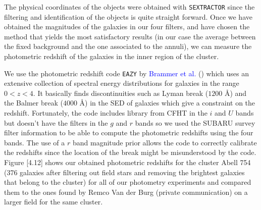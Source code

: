 The physical coordinates of the objects  were obtained with \texttt{SEXTRACTOR} since the filtering and identification of the objects is quite straight forward. Once we have obtained the magnitudes of the galaxies in our four filters, and have chosen the method that yields the most satisfactory results (in our case the average between the fixed background and the one associated to the annuli), we can measure the photometric redshift of the galaxies in the inner region of the cluster.

We use the photometric redshift code \texttt{EAZY}  by \textcolor{blue}{Brammer et al.} (\citeyear{Reference22}) which uses an extensive collection of spectral energy distributions for galaxies in the range $0<z<4$. It basically finds discontinuities such as Lyman break ($1200$ \AA) and the Balmer break ($4000$ \AA) in the SED of galaxies which give a constraint on the redshift. Fortunately, the code includes library from CFHT in the $i$ and $U$ bands but doesn't have the filters in the $g$ and $r$ bands so we used the SUBARU survey filter information to be able to compute the photometric redshifts using the four bands. The use of a $r$ band magnitude prior allows the code to correctly calibrate the redshifts since the location of the break might be misunderstood by the code. Figure [4.12] shows our obtained photometric redshifts for the cluster Abell 754 (376 galaxies after filtering out field stars and removing the brightest galaxies that belong to the cluster) for all of our photometry experiments and compared them to the ones found by Remco Van der Burg (private communication) on a larger field for the same cluster. 

